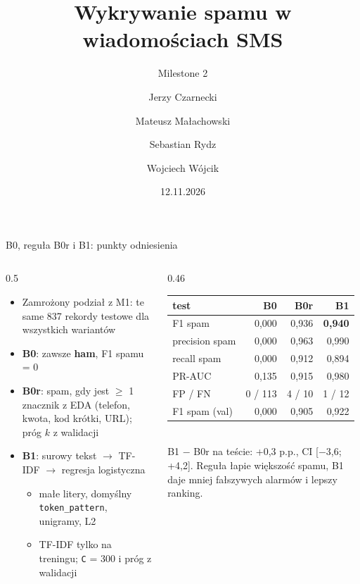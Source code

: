 \documentclass[aspectratio=169,10pt]{beamer}
\title{Wykrywanie spamu w wiadomościach SMS}
\subtitle{Milestone 2}
\author{Jerzy Czarnecki \and Mateusz Małachowski \and Sebastian Rydz \and Wojciech Wójcik}
\date{12.11.2026}
\newcommand{\ham}{\textcolor{ham}{\textbf{ham}}}
\begin{document}
\maketitle

\begin{frame}{B0, reguła B0r i B1: punkty odniesienia}
  \begin{columns}[T]
    \begin{column}{0.5\textwidth}
      \begin{itemize}
        \item Zamrożony podział z M1: te same 837 rekordy testowe dla wszystkich wariantów
        \item \textbf{B0}: zawsze \ham{}, F1 spamu = 0
        \item \textbf{B0r}: spam, gdy jest $\geq$ 1 znacznik z EDA (telefon, kwota, kod krótki, URL); próg $k$ z walidacji
        \item \textbf{B1}: surowy tekst $\to$ TF-IDF $\to$ regresja logistyczna
        \begin{itemize}
          \item małe litery, domyślny \texttt{token\_pattern}, unigramy, L2
          \item TF-IDF tylko na treningu; \texttt{C} = 300 i próg z walidacji
        \end{itemize}
      \end{itemize}
    \end{column}
    \begin{column}{0.46\textwidth}
      \centering\small
      \begin{tabular}{lrrr}
        \toprule
        test & B0 & B0r & B1 \\
        \midrule
        F1 spam        & 0,000 & 0,936 & \textbf{0,940} \\
        precision spam & 0,000 & 0,963 & 0,990 \\
        recall spam    & 0,000 & 0,912 & 0,894 \\
        PR-AUC         & 0,135 & 0,915 & 0,980 \\
        FP / FN        & 0 / 113 & 4 / 10 & 1 / 12 \\
        \midrule
        F1 spam (val)  & 0,000 & 0,905 & 0,922 \\
        \bottomrule
      \end{tabular}\\[0.6em]
      {\small B1 $-$ B0r na teście: +0,3 p.p., CI [$-$3,6; +4,2]. Reguła łapie większość spamu, B1 daje mniej fałszywych alarmów i lepszy ranking.}
    \end{column}
  \end{columns}
\end{frame}
\end{document}
